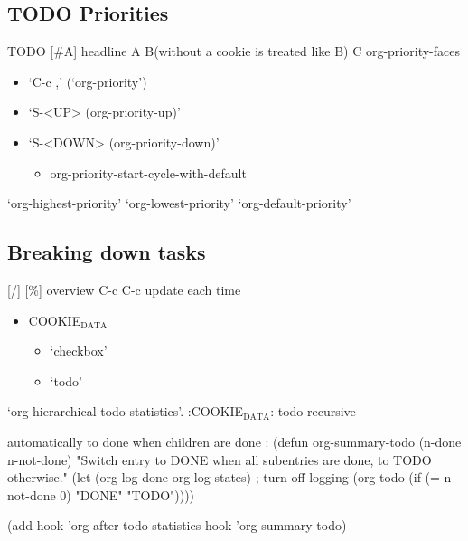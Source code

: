 \documentclass[11pt]{article}
\begin{document}
\subsection{{\bfseries\sffamily TODO} Priorities}
\label{sec:org1ec7b87}
TODO [\#A] headline
A B(without a cookie is treated like B) C
org-priority-faces

\begin{itemize}
\item ‘C-c ,’   (‘org-priority’)
\item ‘S-<UP>     (org-priority-up)’
\item ‘S-<DOWN>     (org-priority-down)’
\begin{itemize}
\item org-priority-start-cycle-with-default
\end{itemize}
\end{itemize}

‘org-highest-priority’
‘org-lowest-priority’
‘org-default-priority’
\subsection{Breaking down tasks}
\label{sec:org7c2d306}
[/] [\%] overview
C-c C-c update each time

\begin{itemize}
\item COOKIE\(_{\text{DATA}}\)
\begin{itemize}
\item ‘checkbox’
\item ‘todo’
\end{itemize}
\end{itemize}

‘org-hierarchical-todo-statistics’.  
:COOKIE\(_{\text{DATA}}\): todo recursive

automatically to done when children are done :
(defun org-summary-todo (n-done n-not-done)
       "Switch entry to DONE when all subentries are done, to TODO otherwise."
       (let (org-log-done org-log-states)   ; turn off logging
         (org-todo (if (= n-not-done 0) "DONE" "TODO"))))

(add-hook 'org-after-todo-statistics-hook 'org-summary-todo)
\end{document}
